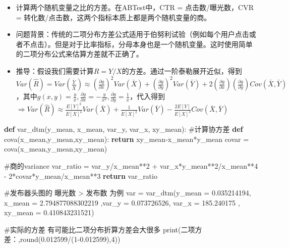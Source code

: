 \documentclass[
  letterpaper,
  DIV=11,
  numbers=noendperiod]{scrreprt}
\newenvironment{Shaded}{\begin{snugshade}}{\end{snugshade}}
\newcommand{\BuiltInTok}[1]{\textcolor[rgb]{0.00,0.23,0.31}{#1}}
\newcommand{\CommentTok}[1]{\textcolor[rgb]{0.37,0.37,0.37}{#1}}
\newcommand{\ControlFlowTok}[1]{\textcolor[rgb]{0.00,0.23,0.31}{\textbf{#1}}}
\newcommand{\DecValTok}[1]{\textcolor[rgb]{0.68,0.00,0.00}{#1}}
\newcommand{\FloatTok}[1]{\textcolor[rgb]{0.68,0.00,0.00}{#1}}
\newcommand{\KeywordTok}[1]{\textcolor[rgb]{0.00,0.23,0.31}{\textbf{#1}}}
\newcommand{\NormalTok}[1]{\textcolor[rgb]{0.00,0.23,0.31}{#1}}
\newcommand{\OperatorTok}[1]{\textcolor[rgb]{0.37,0.37,0.37}{#1}}
\newcommand{\StringTok}[1]{\textcolor[rgb]{0.13,0.47,0.30}{#1}}
\begin{document}
\begin{itemize}
\item
  计算两个随机变量之比的方差。在ABTest中，CTR = 点击数/曝光数，CVR =
  转化数/点击数，这两个指标本质上都是两个随机变量的商。
\item
  问题背景：传统的二项分布方差公式适用于伯努利试验（例如每个用户点击或者不点击）。但是对于比率指标，分母本身也是一个随机变量。这时使用简单的二项分布公式来估算方差就不正确了。
\item
  推导：假设我们需要计算\(R = Y/X\)的方差。通过一阶泰勒展开近似，得到\(Var(\hat{R}) = Var\left(\frac{\bar{Y}}{\bar{X}}\right) \approx \left(\frac{\partial g}{\partial x}\right)^2 Var(\bar{X}) + \left(\frac{\partial g}{\partial y}\right)^2 Var(\bar{Y}) + 2\left(\frac{\partial g}{\partial x}\right)\left(\frac{\partial g}{\partial y}\right)Cov(\bar{X}, \bar{Y})\)，其中\(g(x,y) = \frac{y}{x},  \frac{\partial g}{\partial x} = -\frac{y}{x^2}, \frac{\partial g}{\partial y} = \frac{1}{x}\)，代入得到\(\Rightarrow Var(\hat{R}) \approx \frac{E[Y]^2}{E[X]^4} Var(\bar{X}) + \frac{1}{E[X]^2} Var(\bar{Y}) - \frac{2E[Y]}{E[X]^3} Cov(\bar{X}, \bar{Y})\)
\end{itemize}

\begin{Shaded}
\begin{Highlighting}[]
\KeywordTok{def}\NormalTok{ var\_dtm(y\_mean, x\_mean, var\_y, var\_x, xy\_mean):}
    \CommentTok{\#计算协方差}
    \KeywordTok{def}\NormalTok{ cova(x\_mean,y\_mean,xy\_mean):}
        \ControlFlowTok{return}\NormalTok{ xy\_mean}\OperatorTok{{-}}\NormalTok{x\_mean}\OperatorTok{*}\NormalTok{y\_mean}
\NormalTok{    covar }\OperatorTok{=}\NormalTok{ cova(x\_mean,y\_mean,xy\_mean)}
    
    \CommentTok{\#商的variance}
\NormalTok{    var\_ratio }\OperatorTok{=}\NormalTok{ var\_y}\OperatorTok{/}\NormalTok{x\_mean}\OperatorTok{**}\DecValTok{2} \OperatorTok{+}\NormalTok{ var\_x}\OperatorTok{*}\NormalTok{y\_mean}\OperatorTok{**}\DecValTok{2}\OperatorTok{/}\NormalTok{x\_mean}\OperatorTok{**}\DecValTok{4} \OperatorTok{{-}} \DecValTok{2}\OperatorTok{*}\NormalTok{covar}\OperatorTok{*}\NormalTok{y\_mean}\OperatorTok{/}\NormalTok{x\_mean}\OperatorTok{**}\DecValTok{3}
    \ControlFlowTok{return}\NormalTok{ var\_ratio}
  
  
\CommentTok{\#发布器头图的 曝光数 \textgreater{} 发布数 为例}
\NormalTok{var }\OperatorTok{=}\NormalTok{ var\_dtm(y\_mean }\OperatorTok{=} \FloatTok{0.035214194}\NormalTok{, x\_mean }\OperatorTok{=} \FloatTok{2.794877088302219}
\NormalTok{                ,var\_y }\OperatorTok{=} \FloatTok{0.073726526}\NormalTok{, var\_x }\OperatorTok{=} \FloatTok{185.240175}
\NormalTok{                    , xy\_mean }\OperatorTok{=} \FloatTok{0.410843231521}\NormalTok{)}


\CommentTok{\#实际的方差 有可能比二项分布折算方差会大很多}
\BuiltInTok{print}\NormalTok{(}\StringTok{\textquotesingle{}二项方差：\textquotesingle{}}\NormalTok{,}\BuiltInTok{round}\NormalTok{(}\FloatTok{0.012599}\OperatorTok{/}\NormalTok{(}\DecValTok{1}\OperatorTok{{-}}\FloatTok{0.012599}\NormalTok{),}\DecValTok{4}\NormalTok{))}
\end{Highlighting}
\end{Shaded}
\end{document}
